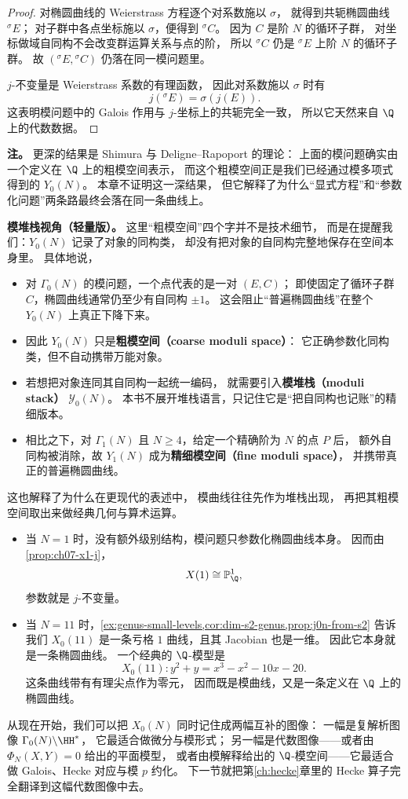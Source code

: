 \begin{proof}
对椭圆曲线的 Weierstrass 方程逐个对系数施以 $\sigma$，
就得到共轭椭圆曲线 ${}^{\sigma}E$；
对子群中各点坐标施以 $\sigma$，便得到 ${}^{\sigma}C$。
因为 $C$ 是阶 $N$ 的循环子群，
对坐标做域自同构不会改变群运算关系与点的阶，
所以 ${}^{\sigma}C$ 仍是 ${}^{\sigma}E$ 上阶 $N$ 的循环子群。
故 $({}^{\sigma}E,{}^{\sigma}C)$ 仍落在同一模问题里。

$j$-不变量是 Weierstrass 系数的有理函数，
因此对系数施以 $\sigma$ 时有
\[
  j({}^{\sigma}E)=\sigma(j(E)).
\]
这表明模问题中的 Galois 作用与 $j$-坐标上的共轭完全一致，
所以它天然来自 $\Q$ 上的代数数据。
\end{proof}

\textbf{注。}
更深的结果是 Shimura 与 Deligne--Rapoport 的理论：
上面的模问题确实由一个定义在 $\Q$ 上的粗模空间表示，
而这个粗模空间正是我们已经通过模多项式得到的 $Y_0(N)$。
本章不证明这一深结果，
但它解释了为什么“显式方程”和“参数化问题”两条路最终会落在同一条曲线上。

\textbf{模堆栈视角（轻量版）。}
这里“粗模空间”四个字并不是技术细节，
而是在提醒我们：$Y_0(N)$ 记录了对象的同构类，
却没有把对象的自同构完整地保存在空间本身里。
具体地说，
\begin{itemize}
  \item 对 $\Gamma_0(N)$ 的模问题，一个点代表的是一对 $(E,C)$；
        即使固定了循环子群 $C$，椭圆曲线通常仍至少有自同构 $\pm 1$。
        这会阻止“普遍椭圆曲线”在整个 $Y_0(N)$ 上真正下降下来。
  \item 因此 $Y_0(N)$ 只是\textbf{粗模空间（coarse moduli space）}：
        它正确参数化同构类，但不自动携带万能对象。
  \item 若想把对象连同其自同构一起统一编码，
        就需要引入\textbf{模堆栈（moduli stack）} $\mathcal Y_0(N)$。
        本书不展开堆栈语言，只记住它是“把自同构也记账”的精细版本。
  \item 相比之下，对 $\Gamma_1(N)$ 且 $N\ge 4$，给定一个精确阶为 $N$ 的点 $P$ 后，
        额外自同构被消除，故 $Y_1(N)$ 成为\textbf{精细模空间（fine moduli space）}，
        并携带真正的普遍椭圆曲线。
\end{itemize}
这也解释了为什么在更现代的表述中，
模曲线往往先作为堆栈出现，
再把其粗模空间取出来做经典几何与算术运算。

\begin{example}[两个基本例子]
\label{ex:ch07-basic-models}
\begin{itemize}
  \item[(i)] 当 $N=1$ 时，没有额外级别结构，模问题只参数化椭圆曲线本身。
  因而由 \cref{prop:ch07-x1-j}，
  \[
    X(1)\cong \mathbb P^1_{\Q},
  \]
  参数就是 $j$-不变量。

  \item[(ii)] 当 $N=11$ 时，\cref{ex:genus-small-levels,cor:dim-s2-genus,prop:j0n-from-s2} 告诉我们
  $X_0(11)$ 是一条亏格 $1$ 曲线，且其 Jacobian 也是一维。
  因此它本身就是一条椭圆曲线。
  一个经典的 $\Q$-模型是
  \[
    X_0(11): y^2+y=x^3-x^2-10x-20.
  \]
  这条曲线带有有理尖点作为零元，
  因而既是模曲线，又是一条定义在 $\Q$ 上的椭圆曲线。
\end{itemize}
\end{example}

从现在开始，我们可以把 $X_0(N)$ 同时记住成两幅互补的图像：
一幅是复解析图像 $\Gamma_0(N)\backslash\HH^*$，
它最适合做微分与模形式；
另一幅是代数图像——或者由 $\Phi_N(X,Y)=0$ 给出的平面模型，
或者由模解释给出的 $\Q$-模空间——它最适合做 Galois、Hecke 对应与模 $p$ 约化。
下一节就把第\ref{ch:hecke}章里的 Hecke 算子完全翻译到这幅代数图像中去。
